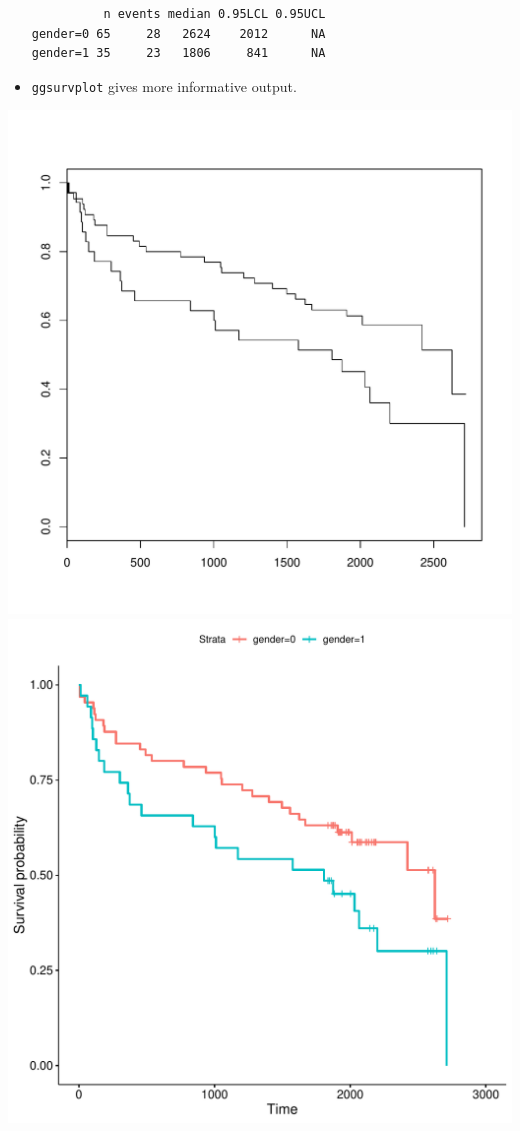 \documentclass[10pt]{beamer}\usepackage[]{graphicx}\usepackage[]{color}
\makeatletter
\newenvironment{kframe}{%
 \def\at@end@of@kframe{}%
 \ifinner\ifhmode%
  \def\at@end@of@kframe{\end{minipage}}%
  \begin{minipage}{\columnwidth}%
 \fi\fi%
 \def\FrameCommand##1{\hskip\@totalleftmargin \hskip-\fboxsep
 \colorbox{shadecolor}{##1}\hskip-\fboxsep
     \hskip-\linewidth \hskip-\@totalleftmargin \hskip\columnwidth}%
 \MakeFramed {\advance\hsize-\width
   \@totalleftmargin\z@ \linewidth\hsize
   \@setminipage}}%
 {\par\unskip\endMakeFramed%
 \at@end@of@kframe}
\newenvironment{knitrout}{}{} %
\renewenvironment{knitrout}{\setlength{\topsep}{-.2mm}}{}
\newcommand{\code}[1]{{\texttt{#1}}}
\makeatother
\begin{document}
\begin{frame}[fragile]
\begin{itemize}
\begin{knitrout}
\begin{kframe}
\begin{verbatim}
          n events median 0.95LCL 0.95UCL
gender=0 65     28   2624    2012      NA
gender=1 35     23   1806     841      NA
\end{verbatim}
\end{kframe}
\end{knitrout}
  \item \code{ggsurvplot} gives more informative output.
  \end{itemize} \vspace{-.32cm}
  \begin{center}
    \includegraphics[scale = .26]{km-gender1}\hspace{.2cm}
    \includegraphics[scale = .26]{km-gender2}
  \end{center}
\end{frame}
\end{document}

